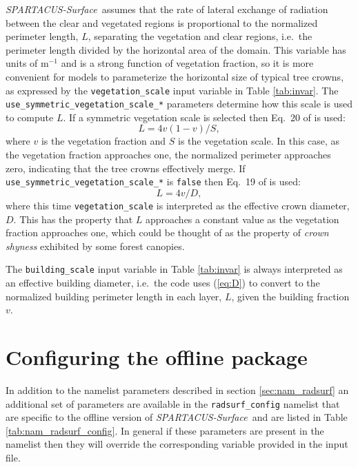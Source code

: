\documentclass[a4,oneside]{article}
\def\codesize{\small}
\def\spsurf{\emph{SPARTACUS-Surface}}
\def\code#1{{\codesize\texttt{#1}}}
\begin{document}
\spsurf\ assumes that the rate of lateral exchange of radiation
between the clear and vegetated regions is proportional to the
normalized perimeter length, $L$, separating the vegetation and clear
regions, i.e.\ the perimeter length divided by the horizontal area of
the domain. This variable has units of m$^{-1}$ and is a strong
function of vegetation fraction, so it is more convenient for models to
parameterize the horizontal size of typical tree crowns, as expressed
by the \code{vegetation\_scale} input variable in Table
\ref{tab:invar}. The \code{use\_symmetric\_vegetation\_scale\_*}
parameters determine how this scale is used to compute $L$.  If a
symmetric vegetation scale is selected then Eq.\ 20 of
\cite{Hogan+2018} is used:
%
\begin{equation}
  L=4v(1-v)/S,\label{eq:S}
\end{equation}
%
where $v$ is the vegetation fraction and $S$ is the vegetation scale.
In this case, as the vegetation fraction approaches one, the
normalized perimeter approaches zero, indicating that the tree crowns
effectively merge. If \code{use\_symmetric\_vegetation\_scale\_*} is
\code{false} then Eq.\ 19 of \cite{Hogan+2018} is used:
%
\begin{equation}
  L=4v/D,\label{eq:D}
\end{equation}
%
where this time \code{vegetation\_scale} is interpreted as the
effective crown diameter, $D$. This has the property that $L$
approaches a constant value as the vegetation fraction approaches one,
which could be thought of as the property of \emph{crown shyness}
exhibited by some forest canopies.

The \code{building\_scale} input variable in Table \ref{tab:invar} is
always interpreted as an effective building diameter, i.e.\ the code
uses (\ref{eq:D}) to convert to the normalized building perimeter
length in each layer, $L$, given the building fraction $v$.

\section{Configuring the offline package}
\label{sec:nam_radsurf_config}
In addition to the namelist parameters described in section
\ref{sec:nam_radsurf} an additional set of parameters are available in
the \code{radsurf\_config} namelist that are specific to the offline
version of \spsurf\ and are listed in Table
\ref{tab:nam_radsurf_config}. In general if these parameters are
present in the namelist then they will override the corresponding
variable provided in the input file.
\end{document}
